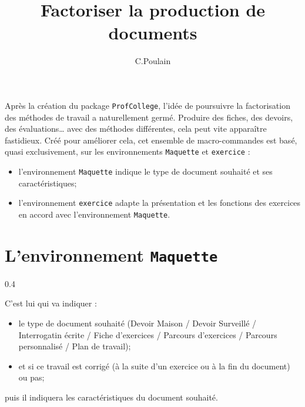 \documentclass[12pt,french]{article}
\title{Factoriser la production de documents}
\author{C.Poulain}
\date{\PfMfiledate}
\begin{document}
\maketitle
\thispagestyle{empty}
Après la création du package \lstinline!ProfCollege!, l'idée de poursuivre la factorisation des méthodes de travail a naturellement germé. Produire des fiches, des devoirs, des évaluations\dots{} avec des méthodes différentes, cela peut vite apparaître fastidieux. Créé pour améliorer cela, cet ensemble de macro-commandes est basé, quasi exclusivement, sur les environnements \lstinline!Maquette! et \lstinline!exercice! :
\begin{itemize}
\item l'environnement \lstinline!Maquette! indique le type de document souhaité et ses caractéristiques;
\item l'environnement \lstinline!exercice! adapte la présentation et les fonctions des exercices en accord avec l'environnement \lstinline!Maquette!.
\end{itemize}
\clearpage
\section*{L'environnement \lstinline!Maquette!}
\begin{Codes}{0.4}{}
\begin{Maquette}
      
\end{Maquette}
\end{Codes}
C'est lui qui va indiquer :
\begin{itemize}
\item le type de document souhaité (Devoir Maison / Devoir Surveillé / Interrogatin écrite / Fiche d'exercices / Parcours d'exercices / Parcours personnalisé / Plan de travail);
\item et si ce travail est corrigé (à la suite d'un exercice ou à la fin du document) ou pas;
\end{itemize}
puis il indiquera les caractéristiques du document souhaité.
\clearpage
\end{document}
